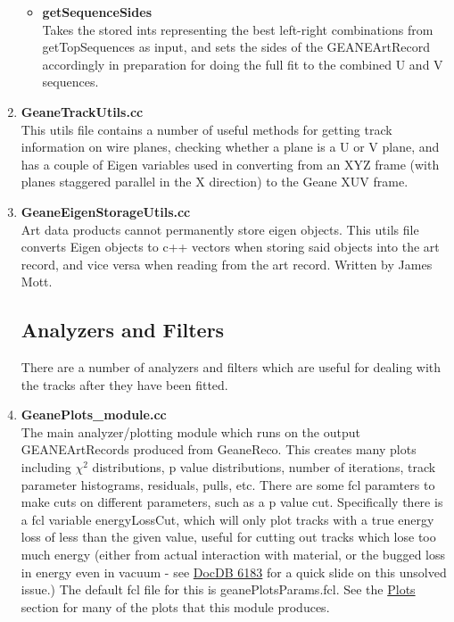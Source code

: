 \begin{enumerate}
\begin{itemize}
          \item{\bf{getSequenceSides}} \\
          Takes the stored ints representing the best left-right combinations from getTopSequences as input, and sets the sides of the GEANEArtRecord accordingly in preparation for doing the full fit to the combined U and V sequences.

        \end{itemize}

      \item{\bf{GeaneTrackUtils.cc}} \\
      This utils file contains a number of useful methods for getting track information on wire planes, checking whether a plane is a U or V plane, and has a couple of Eigen variables used in converting from an XYZ frame (with planes staggered parallel in the X direction) to the Geane XUV frame.

      \item{\bf{GeaneEigenStorageUtils.cc}} \\
      Art data products cannot permanently store eigen objects. This utils file converts Eigen objects to c++ vectors when storing said objects into the art record, and vice versa when reading from the art record. Written by James Mott.



  \subsection{Analyzers and Filters}
  \label{sec:AnaFilt}

  There are a number of analyzers and filters which are useful for dealing with the tracks after they have been fitted.

      \item{\bf{GeanePlots\_module.cc}} \\
      The main analyzer/plotting module which runs on the output GEANEArtRecords produced from GeaneReco. This creates many plots including $\chi^{2}$ distributions, p value distributions, number of iterations, track parameter histograms, residuals, pulls, etc. There are some fcl paramters to make cuts on different parameters, such as a p value cut. Specifically there is a fcl variable energyLossCut, which will only plot tracks with a true energy loss of less than the given value, useful for cutting out tracks which lose too much energy (either from actual interaction with material, or the bugged loss in energy even in vacuum - see \href{https://gm2-docdb.fnal.gov/cgi-bin/private/ShowDocument?docid=6183}{DocDB 6183} for a quick slide on this unsolved issue.) The default fcl file for this is geanePlotsParams.fcl. See the \hyperref[sec:Plots]{Plots} section for many of the plots that this module produces.


\end{enumerate}
